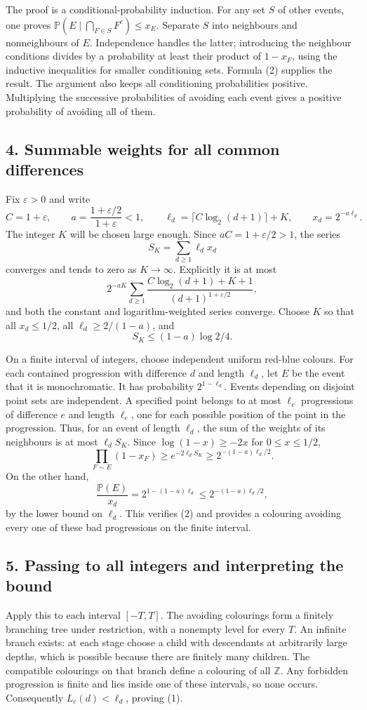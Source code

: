 The proof is a conditional-probability induction. For any set $S$ of other events, one proves
$\mathbb P(E\mid\bigcap_{F\in S}F^c)\le x_E$.
Separate $S$ into neighbours and nonneighbours of $E$. Independence handles the latter; introducing the neighbour conditions divides by a probability at least their product of $1-x_F$, using the inductive inequalities for smaller conditioning sets. Formula (2) supplies the result. The argument also keeps all conditioning probabilities positive. Multiplying the successive probabilities of avoiding each event gives a positive probability of avoiding all of them.

\subsection*{4. Summable weights for all common differences}
Fix $\varepsilon>0$ and write
\[
 C=1+\varepsilon,\qquad a=\frac{1+\varepsilon/2}{1+\varepsilon}<1,
 \qquad\ell_d=\lceil C\log_2(d+1)\rceil+K,
 \qquad x_d=2^{-a\ell_d}.
\]
The integer $K$ will be chosen large enough. Since $aC=1+\varepsilon/2>1$, the series
\[
 S_K=\sum_{d\ge1}\ell_dx_d
\]
converges and tends to zero as $K\to\infty$. Explicitly it is at most
\[
 2^{-aK}\sum_{d\ge1}
 \frac{C\log_2(d+1)+K+1}{(d+1)^{1+\varepsilon/2}},
\]
and both the constant and logarithm-weighted series converge. Choose $K$ so that all $x_d\le1/2$, all $\ell_d\ge2/(1-a)$, and
\[
 S_K\le(1-a)\log 2/4.\tag{3}
\]

On a finite interval of integers, choose independent uniform red-blue colours. For each contained progression with difference $d$ and length $\ell_d$, let $E$ be the event that it is monochromatic. It has probability $2^{1-\ell_d}$. Events depending on disjoint point sets are independent. A specified point belongs to at most $\ell_e$ progressions of difference $e$ and length $\ell_e$, one for each possible position of the point in the progression. Thus, for an event of length $\ell_d$, the sum of the weights of its neighbours is at most $\ell_d S_K$. Since $\log(1-x)\ge-2x$ for $0\le x\le1/2$,
\[
 \prod_{F\sim E}(1-x_F)\ge e^{-2\ell_dS_K}
 \ge2^{-(1-a)\ell_d/2}.
\]
On the other hand,
\[
 \frac{\mathbb P(E)}{x_d}=2^{1-(1-a)\ell_d}
 \le2^{-(1-a)\ell_d/2},
\]
by the lower bound on $\ell_d$. This verifies (2) and provides a colouring avoiding every one of these bad progressions on the finite interval.

\subsection*{5. Passing to all integers and interpreting the bound}
Apply this to each interval $[-T,T]$. The avoiding colourings form a finitely branching tree under restriction, with a nonempty level for every $T$. An infinite branch exists: at each stage choose a child with descendants at arbitrarily large depths, which is possible because there are finitely many children. The compatible colourings on that branch define a colouring of all $\mathbb Z$. Any forbidden progression is finite and lies inside one of these intervals, so none occurs. Consequently $L_c(d)<\ell_d$, proving (1).

